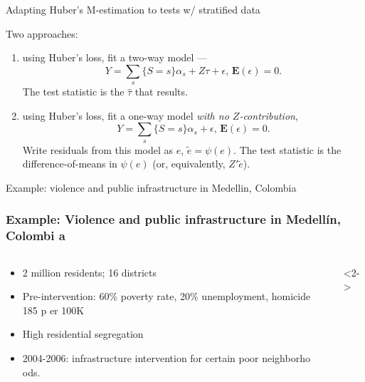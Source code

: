 \begin{frame}{Adapting Huber's M-estimation to tests w/ stratified data}


      Two approaches:
      \begin{enumerate}
      \item using Huber's loss, fit a two-way model  --- 
$$
Y = \sum_{s}\{S=s\}\alpha_{s} + Z\tau + \epsilon,\, \mathbf{E}(\epsilon) = 0.
$$  
The test statistic is the $\hat{\tau}$ that results.
\item using Huber's loss, fit a one-way model \textit{with no $Z$-contribution},
$$
Y = \sum_{s}\{S=s\}\alpha_{s} + \epsilon,\, \mathbf{E}(\epsilon) = 0.
$$  
Write residuals from this model as $e$, $\tilde{e} = \psi(e)$.  The test statistic is the difference-of-means in $\psi(e)$ (or, equivalently, $Z'\tilde{e}$).
      \end{enumerate}



  
\end{frame}
\begin{frame}{Example: violence and public infrastructure in Medellin, Colombia}
  
\frametitle{Example: Violence and public infrastructure in Medell{\'i}n, Colombi
a}
\begin{columns}
  \begin{column}{.5\linewidth}
    \begin{itemize}
    \item 2 million residents; 16 districts
    \item Pre-intervention: 60\% poverty rate, 20\% unemployment, homicide 185 p
er 100K
    \item High residential segregation
    \item<2-> 2004-2006: infrastructure intervention for certain poor neighborho
ods.
    \end{itemize}
  \end{column}
  \begin{column}{.5\linewidth}
\only<2-\mynoteonly>{}
  \end{column}
\end{columns}

\end{frame}



